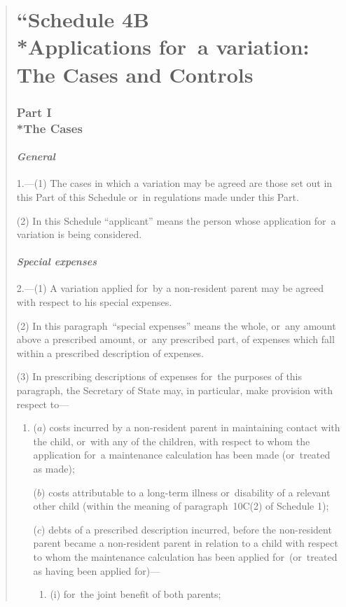 \documentclass[12pt,a4paper]{article}
\begin{document}
\begin{quotation}
\part*{\noindent “S\lowercase{CHEDULE} 4B\\*Applications for~a variation: The Cases and Controls}

\section*{Part I\\*The Cases}

\subsection*{\itshape General}

1.---(1) The cases in which a variation may be agreed are those set out in this Part of this Schedule or~in regulations made under this Part.

(2) In this Schedule “applicant” means the person whose application for~a variation is being considered.

\subsection*{\itshape Special expenses}

2.---(1) A variation applied for~by a non-resident parent may be agreed with respect to his special expenses.

(2) In this paragraph~“special expenses” means the whole, or~any amount above a prescribed amount, or~any prescribed part, of expenses which fall within a prescribed description of expenses.

(3) In prescribing descriptions of expenses for~the purposes of this paragraph, the Secretary of State may, in particular, make provision with respect to—
\begin{enumerate}\item[]
($a$) costs incurred by a non-resident parent in maintaining contact with the child, or~with any of the children, with respect to whom the application for~a maintenance calculation has been made (or~treated as made);

($b$) costs attributable to a long-term illness or~disability of a relevant other child (within the meaning of paragraph~10C(2)  of Schedule 1);

($c$) debts of a prescribed description incurred, before the non-resident parent became a non-resident parent in relation to a child with respect to whom the maintenance calculation has been applied for~(or~treated as having been applied for)—
\begin{enumerate}\item[]
(i) for~the joint benefit of both parents;


\end{enumerate}
\end{enumerate}
\end{quotation}
\end{document}
